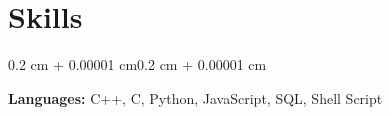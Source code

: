 \documentclass[10pt, letterpaper]{article}
\newenvironment{highlights}{
    \begin{itemize}[
        topsep=0.05 cm,
        parsep=0.05 cm,
        partopsep=0pt,
        itemsep=0pt,
        leftmargin=0.4 cm + 10pt
    ]
}{
    \end{itemize}
}
\newenvironment{onecolentry}{
    \begin{adjustwidth}{0.2 cm + 0.00001 cm}{0.2 cm + 0.00001 cm}
}{
    \end{adjustwidth}
}
\newenvironment{twocolentry}[2][]{
    \onecolentry
    \def\secondColumn{#2}
    \setcolumnwidth{\fill, 4.5 cm}
    \begin{paracol}{2}
}{
    \switchcolumn \raggedleft \secondColumn
    \end{paracol}
    \endonecolentry
}
\let\hrefWithoutArrow\href
\renewcommand{\href}[2]{\hrefWithoutArrow{#1}{\ifthenelse{\equal{#2}{}}{ }{#2 }\raisebox{.15ex}{\footnotesize \faExternalLink*}}}
\begin{document}
    



    \section{Skills}
        \begin{onecolentry}
            \textbf{Languages:} C++, C, Python, JavaScript, SQL, Shell Script
        \end{onecolentry}
        
\end{document}
